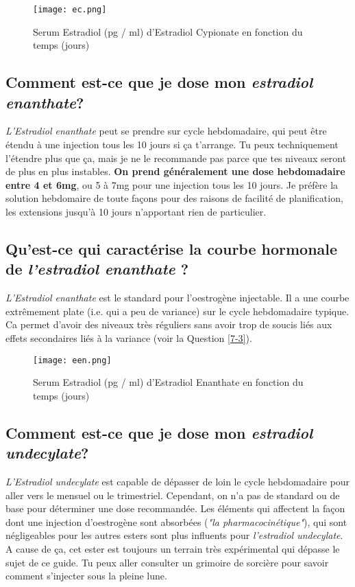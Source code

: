 \documentclass{article}
\begin{document}
 \begin{figure}[H]
     \centering
     \texttt{[image: ec.png]}
     \caption{Serum Estradiol (pg / ml) d'Estradiol Cypionate en fonction du temps (jours) }
     \label{fig:ec}
 \end{figure}

\subsection{Comment est-ce que je dose mon \textit{estradiol enanthate}?}

\textit{L'Estradiol enanthate} peut se prendre sur cycle hebdomadaire, qui peut être étendu à une injection tous les 10 jours si ça t'arrange. Tu peux techniquement l'étendre plus que ça, mais je ne le recommande pas parce que tes niveaux seront de plus en plus instables. \textbf{On prend généralement une dose hebdomadaire entre 4 et 6mg}, ou 5 à 7mg pour une injection tous les 10 jours. Je préfère la solution hebdomaire de toute façons pour des raisons de facilité de planification, les extensions jusqu'à 10 jours n'apportant rien de particulier. 

\subsection{Qu'est-ce qui caractérise la courbe hormonale de \textit{l'estradiol enanthate} ?}

\textit{L'Estradiol enanthate} est le standard pour l'oestrogène injectable. Il a une courbe extrêmement plate (i.e. qui a peu de variance) sur le cycle hebdomadaire typique. Ca permet d'avoir des niveaux très réguliers sans avoir trop de soucis liés aux effets secondaires liés à la variance (voir la Question \ref{7-3}).

 \begin{figure}[H]
     \centering
     \texttt{[image: een.png]}
     \caption{Serum Estradiol (pg / ml) d'Estradiol Enanthate en fonction du temps (jours) }
     \label{fig:een}
 \end{figure}

\subsection{Comment est-ce que je dose mon \textit{estradiol undecylate}?}

\textit{L'Estradiol undecylate} est capable de dépasser de loin le cycle hebdomadaire pour aller vers le mensuel ou le trimestriel. Cependant, on n'a pas de standard ou de base pour déterminer une dose recommandée. Les éléments qui affectent la façon dont une injection d'oestrogène sont absorbées (\textit{"la pharmacocinétique"}), qui sont négligeables pour les autres esters sont plus influents pour \textit{l'estradiol undecylate}. A cause de ça, cet ester est toujours un terrain très expérimental qui dépasse le sujet de ce guide. Tu peux aller consulter un grimoire de sorcière pour savoir comment s'injecter sous la pleine lune.
\end{document}
